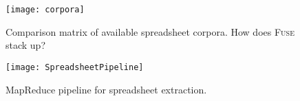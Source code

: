 \documentclass[conference]{IEEEtran}
\begin{document}
\begin{figure}[!t]
\centering
\texttt{[image: corpora]}
\caption{Comparison matrix of available spreadsheet corpora. How does \textsc{Fuse} stack up?}
\label{fig:corpora}
\end{figure}

\begin{figure}[!t]
\centering
\texttt{[image: SpreadsheetPipeline]}
\caption{MapReduce pipeline for spreadsheet extraction.}
\label{fig:mrpipeline}
\end{figure}

\end{document}
